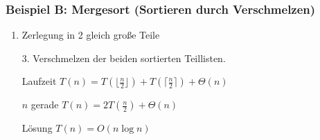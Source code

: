 \subsubsection{Beispiel B: Mergesort \tiny (Sortieren durch Verschmelzen)}
\begin{enumerate}
\item Zerlegung in 2 gleich große Teile
\item[3.] Verschmelzen der beiden sortierten Teillisten.\\
\item[Laufzeit] $T(n) = T(\lfloor \frac{n}{2} \rfloor) + T(\lceil\frac{n}{2}\rceil) + \Theta(n)$\\
\item[$n$ gerade] $T(n) = 2T(\frac{n}{2}) + \Theta(n)$\\
\item[Lösung] $T(n) = O(n \log n)$
\end{enumerate}
